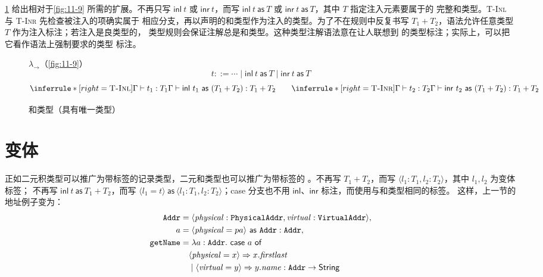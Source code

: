 \cref{fig:11-10} 给出相对于\cref{fig:11-9} 所需的扩展。不再只写
\(\mathsf{inl}\ t\) 或 \(\mathsf{inr}\ t\)，而写
\(\mathsf{inl}\ t\ \mathsf{as}\ T\) 或
\(\mathsf{inr}\ t\ \mathsf{as}\ T\)，其中 \(T\) 指定注入元素要属于的
完整和类型。\textsc{T-Inl} 与 \textsc{T-Inr} 先检查被注入的项确实属于
相应分支，再以声明的和类型作为注入的类型。为了不在规则中反复书写
\(T_1+T_2\)，语法允许任意类型 \(T\) 作为注入标注；若注入是良类型的，
类型规则会保证注解总是和类型。这种类型注解语法意在让人联想到
 的类型标注；实际上，可以把它看作语法上强制要求的类型
标注。

\begin{figure}[!ht]
\centering
\begin{minipage}{0.98\linewidth}
\small
\taplfigureheader{\(+\)}
  {\(\lambda_{\to}\)（\cref{fig:11-9}）}
\[
t::=\cdots\mid\mathsf{inl}\ t\ \mathsf{as}\ T
\mid\mathsf{inr}\ t\ \mathsf{as}\ T
\]
\[
\inferrule*[right=\textsc{T-Inl}]
 {\Gamma\vdash t_1:T_1}
 {\Gamma\vdash\mathsf{inl}\ t_1\ \mathsf{as}\ (T_1+T_2):T_1+T_2}
\qquad
\inferrule*[right=\textsc{T-Inr}]
 {\Gamma\vdash t_2:T_2}
 {\Gamma\vdash\mathsf{inr}\ t_2\ \mathsf{as}\ (T_1+T_2):T_1+T_2}
\]
\end{minipage}
\caption{和类型（具有唯一类型）}
\label{fig:11-10}
\end{figure}

\section{变体}
\label{sec:11.10}

正如二元积类型可以推广为带标签的记录类型，二元和类型也可以推广为带标签的
。不再写 \(T_1+T_2\)，而写
\(\langle l_1:T_1,l_2:T_2\rangle\)，其中 \(l_1,l_2\) 为变体标签；
不再写 \(\mathsf{inl}\ t\ \mathsf{as}\ T_1+T_2\)，而写
\(\langle l_1=t\rangle\ \mathsf{as}\
\langle l_1:T_1,l_2:T_2\rangle\)；case 分支也不用
\(\mathsf{inl}\)、\(\mathsf{inr}\) 标注，而使用与和类型相同的标签。
这样，上一节的地址例子变为：
\[
\begin{aligned}
\texttt{Addr}&=\langle
 \mathit{physical}:\texttt{PhysicalAddr},
 \mathit{virtual}:\texttt{VirtualAddr}\rangle,\\
a&=\langle\mathit{physical}=pa\rangle\ \mathsf{as}\ \texttt{Addr}
  :\texttt{Addr},\\
\texttt{getName}&=\lambda a:\texttt{Addr}.\
 \mathsf{case}\ a\ \mathsf{of}\\
&\quad\langle\mathit{physical}=x\rangle\Rightarrow x.\mathit{firstlast}\\
&\quad\mid\langle\mathit{virtual}=y\rangle\Rightarrow y.\mathit{name}
 :\texttt{Addr}\to\mathsf{String}
\end{aligned}
\]

